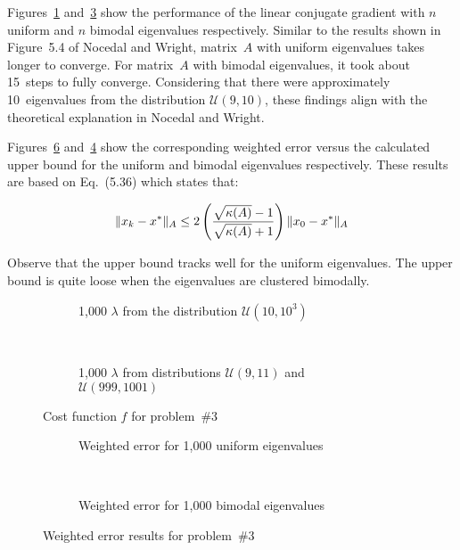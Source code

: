 Figures~\ref{fig:p03:uniformEigenvalues} and~\ref{fig:p03:bimodalEigenvalues} show the performance of the linear conjugate gradient with $n$ uniform and $n$ bimodal eigenvalues respectively.  Similar to the results shown in Figure~5.4 of Nocedal and Wright, matrix~$A$ with uniform eigenvalues takes longer to converge.  For matrix~$A$ with bimodal eigenvalues, it took about 15~steps to fully converge.  Considering that there were approximately 10~eigenvalues from the distribution $\mathcal{U}(9,10)$, these findings align with the theoretical explanation in Nocedal and Wright.

Figures~\ref{fig:p03:bimodalWeightedErr} and~\ref{fig:p03:uniformWeightedErr} show the corresponding weighted error versus the calculated upper bound for the uniform and bimodal eigenvalues respectively.  These results are based on Eq.~(5.36) which states that:

\[ \lVert x_k - x^{*}\rVert_{A} \leq 2\left(\frac{\sqrt{\kappa(A)}-1}{\sqrt{\kappa(A)}+1}\right)\lVert x_0 - x^{*}\rVert_{A} \]

\noindent
Observe that the upper bound tracks well for the uniform eigenvalues.  The upper bound is quite loose when the eigenvalues are clustered bimodally.

\newpage
\begin{figure}[p]
  \centering
  \begin{subfigure}[t]{0.45\textwidth}
    \centering
    
    \caption{\scriptsize 1,000 $\lambda$ from the distribution $\mathcal{U}(10,10^{3})$}\label{fig:p03:uniformEigenvalues}
  \end{subfigure}
  ~
  \begin{subfigure}[t]{0.45\textwidth}
    \centering
    
    \caption{\scriptsize 1,000 $\lambda$ from distributions $\mathcal{U}(9,11)$ and $\mathcal{U}(999,1001)$ }\label{fig:p03:bimodalEigenvalues}
  \end{subfigure}
  \caption{Cost function $f$ for problem~\#3}
\end{figure}

\begin{figure}[p]
  \centering
  \begin{subfigure}[t]{0.45\textwidth}
    \centering
    
    \caption{\scriptsize Weighted error for 1,000 uniform eigenvalues}\label{fig:p03:uniformWeightedErr}
  \end{subfigure}
  ~
  \begin{subfigure}[t]{0.45\textwidth}
    \centering
    
    \caption{\scriptsize Weighted error for 1,000 bimodal eigenvalues}\label{fig:p03:bimodalWeightedErr}
  \end{subfigure}
  \caption{Weighted error results for problem~\#3}
\end{figure}
\clearpage